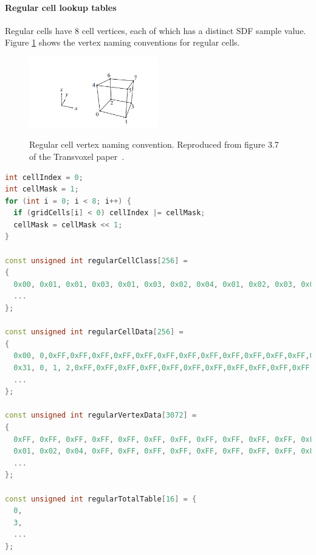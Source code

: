 \documentclass[11pt]{article}
\begin{document}
\paragraph{Regular cell lookup tables}
Regular cells have 8 cell vertices, each of which has a distinct SDF sample value. Figure \ref{fig:tv_labels} shows the vertex naming conventions for regular cells.

\begin{figure}
  \caption{Regular cell vertex naming convention. Reproduced from figure 3.7 of the Transvoxel paper~\cite{lengyel_2010}.}
  \includegraphics[width=0.5\textwidth]{tv_labels.PNG}
  \label{fig:tv_labels}
\end{figure}

\pagebreak

\begin{lstlisting}[language=C++,label={tv_tables},caption={Calculation of \texttt{cellIndex}, and lookup tables, for regular cells. An example of their usage is given below.}]
int cellIndex = 0;
int cellMask = 1;
for (int i = 0; i < 8; i++) {
  if (gridCells[i] < 0) cellIndex |= cellMask;
  cellMask = cellMask << 1;
}

const unsigned int regularCellClass[256] =
{
  0x00, 0x01, 0x01, 0x03, 0x01, 0x03, 0x02, 0x04, 0x01, 0x02, 0x03, 0x04, 0x03, 0x04, 0x04, 0x03,
  ...
};

const unsigned int regularCellData[256] =
{
  0x00, 0,0xFF,0xFF,0xFF,0xFF,0xFF,0xFF,0xFF,0xFF,0xFF,0xFF,0xFF,0xFF,0xFF,0xFF,
  0x31, 0, 1, 2,0xFF,0xFF,0xFF,0xFF,0xFF,0xFF,0xFF,0xFF,0xFF,0xFF,0xFF,0xFF,
  ...
};

const unsigned int regularVertexData[3072] =
{
  0xFF, 0xFF, 0xFF, 0xFF, 0xFF, 0xFF, 0xFF, 0xFF, 0xFF, 0xFF, 0xFF, 0xFF,
  0x01, 0x02, 0x04, 0xFF, 0xFF, 0xFF, 0xFF, 0xFF, 0xFF, 0xFF, 0xFF, 0xFF,
  ...
};

const unsigned int regularTotalTable[16] = {
  0,
  3,
  ...
};
\end{lstlisting}
\end{document}
